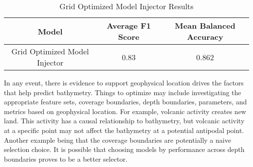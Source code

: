 \begin{table}[htp]
    \centering
    \begin{tabular}{|c c c|}
        \hline
        \textbf{Model} & \textbf{Average F1 Score} & \textbf{Mean Balanced Accuracy} \\
		\hline
		Grid Optimized Model Injector & 0.83 & 0.862 \\
		\hline
    \end{tabular}
    \label{table:GRID_OPT_RESULTS}
    \caption{Grid Optimized Model Injector Results}
\end{table}

\par
In any event, there is evidence to support geophysical location drives the factors that help predict bathymetry.
Things to optimize may include investigating the appropriate feature sets, coverage boundaries, depth boundaries, parameters, and metrics based on geophysical location.
For example, volcanic activity creates new land.
This activity has a causal relationship to bathymetry, but volcanic activity at a specific point may not affect the bathymetry at a potential antipodal point.
Another example being that the coverage boundaries are potentially a naive selection choice.
It is possible that choosing models by performance across depth boundaries proves to be a better selector.

